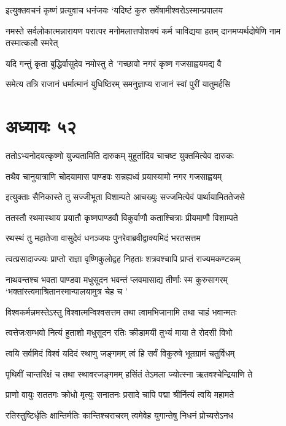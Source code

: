 \twolineshloka
{इत्युक्तवचनं कृष्णं प्रत्युवाच धनंजयः}
{`यदिष्टं कुरु सर्वेषामीश्वरोऽस्मान्प्रपालय}


\threelineshloka
{नमस्ते सर्वलोकात्मन्नारायण परात्पर}
{मनोमलात्तपोशक्यं कर्म चाविद्यया हतम्}
{दानमप्यर्थदोषेणि नाम तस्मात्कलौ स्मरेत्}


\twolineshloka
{यदि गन्तुं कृता बुद्धिर्वासुदेव नमोस्तु ते}
{'गच्छावो नगरं कृष्ण गजसाह्वयमद्य वै}


\twolineshloka
{समेत्य तत्रि राजानं धर्मात्मानं युधिष्ठिरम्}
{समनुज्ञाप्य राजानं स्वां पुरीं यातुमर्हसि}


\chapter{अध्यायः ५२}
\twolineshloka
{ततोऽभ्यनोदयत्कृष्णो युज्यतामिति दारुकम्}
{मुहूर्तादिव चाचष्ट युक्तमित्येव दारुकः}


\twolineshloka
{तथैव चानुयात्राणि चोदयामास पाण्डवः}
{सन्नह्यध्वं प्रयास्यामो नगर गजसाह्वयम्}


\twolineshloka
{इत्युक्ताः सैनिकास्ते तु सज्जीभूता विशाम्पते}
{आचख्युः सज्जमित्येवं पार्थायामिततेजसे}


\twolineshloka
{ततस्तौ रथमास्थाय प्रयातौ कृष्णपाण्डवौ}
{विकुर्वाणौ कताश्चित्राः प्रीयमाणौ विशाम्पते}


\twolineshloka
{रथस्थं तु महातेजा वासुदेवं धनञ्जयः}
{पुनरेवाब्रवीद्वाक्यमिदं भरतसत्तम}


\twolineshloka
{त्वत्प्रसादाज्ज्यः प्राप्तो राज्ञा वृष्णिकुलोद्वह}
{निहताः शत्रवश्चापि प्राप्तं राज्यमकण्टकम्}


\fourlineindentedshloka
{नाथवन्तश्च भवता पाण्डवा मधुसूदन}
{भवन्तं प्लवमासाद्य तीर्णाः स्म कुरुसागरम्}
{`भक्तांस्त्वमाश्रितानस्मान्पालयामुत्र चेह च}
{'}


\twolineshloka
{विश्वकर्मन्नमस्तेऽस्तु विश्वात्मन्विश्वसत्तम}
{तथा त्वामभिजानामि तथा चाहं भवान्मतः}


\twolineshloka
{त्वत्तेजःसम्भवो नित्यं हुताशो मधुसूदन}
{रतिः क्रीडामयी तुभ्यं माया ते रोदसी विभो}


\twolineshloka
{त्वयि सर्वमिदं विश्वं यदिदं स्थाणु जङ्गमम्}
{त्वं हि सर्वं विकुरुषे भूतग्रामं चतुर्विधम्}


\twolineshloka
{पृथिवीं चान्तरिक्षं च तथा स्थावरजङ्गमम्}
{हसिंतं तेऽमला ज्योत्स्ना ऋतवश्चेन्द्रियाणि ते}


\twolineshloka
{प्राणो वायुः सततगः क्रोधो मृत्युः सनातनः}
{प्रसादे चापि पद्मा श्रीर्नित्यं त्वयि महामते}


\twolineshloka
{रतिस्तुष्टिर्धृतिः क्षान्तिर्मतिः कान्तिश्चराचरम्}
{त्वमेवेह युगान्तेषु निधनं प्रोच्यसेऽनध}


